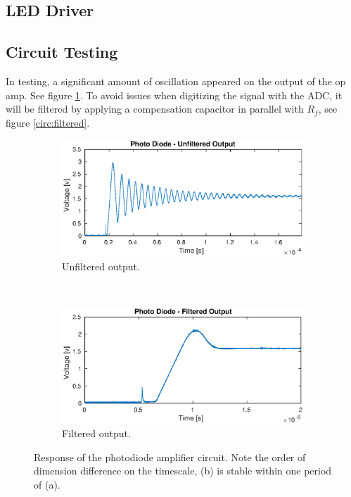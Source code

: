 \subsection{LED Driver}
\subsection{Circuit Testing}
In testing, a significant amount of oscillation appeared on the output of the op amp. See figure \ref{fig:oscillation}. To avoid issues when digitizing the signal with the ADC, it will be filtered by applying a compensation capacitor in parallel with $R_f$, see figure \ref{circ:filtered}.

\begin{figure}[h!]
	\centering
	\begin{subfigure}{\linewidth}
		\includegraphics[width=\linewidth]{images/unfiltered}
		\caption{Unfiltered output.}
		\label{fig:oscillation}
	\end{subfigure}\\
	\begin{subfigure}{\linewidth}
		\includegraphics[width=\linewidth]{images/filtered}
		\caption{Filtered output.}
		\label{fig:nooscillation}
	\end{subfigure}
	\caption{Response of the photodiode amplifier circuit. Note the order of dimension difference on the timescale, (b) is stable within one period of (a).}
	\label{fig:photoresponse}
\end{figure}

